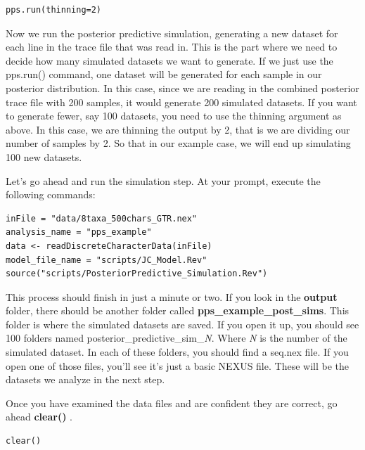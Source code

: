 {\tt \begin{snugshade*}
\begin{lstlisting}
pps.run(thinning=2)
\end{lstlisting}
\end{snugshade*}}
Now we run the posterior predictive simulation, generating a new dataset for each line in the trace file 
that was read in. This is the part where we need to decide how many simulated datasets we want to generate.
If we just use the pps.run() command, one dataset will be generated for each sample in our posterior distribution.
In this case, since we are reading in the combined posterior trace file with 200 
samples, it would generate 200 simulated datasets. If you want to generate fewer, say 100 datasets,
you need to use the thinning argument as above. In this case, we are thinning the output by 2, that is
we are dividing our number of samples by 2. So that in our example case, we will end up simulating 100 
new datasets.

Let's go ahead and run the simulation step. At your \RevBayes prompt, execute the following commands: 
{\tt \begin{Snugshade}[184,207,236]
\begin{lstlisting}
inFile = "data/8taxa_500chars_GTR.nex"
analysis_name = "pps_example"
data <- readDiscreteCharacterData(inFile)
model_file_name = "scripts/JC_Model.Rev"
source("scripts/PosteriorPredictive_Simulation.Rev")
\end{lstlisting}
\end{Snugshade}}

This process should finish in just a minute or two. If you look in the \textbf{output} folder, there should be 
another folder called \textbf{pps\_example\_post\_sims}. This folder is where the simulated datasets are saved. 
If you open it up, you should see 100 folders named posterior\_predictive\_sim\_\textit{N}. Where \textit{N} 
is the number of the simulated dataset. In each of these folders, you should find a seq.nex file. If you 
open one of those files, you'll see it's just a basic NEXUS file. These will be the datasets we analyze 
in the next step.

Once you have examined the data files and are confident they are correct, go ahead \textbf{clear()} \RevBayes.

{\tt \begin{Snugshade}[184,207,236]
\begin{lstlisting}
clear()
\end{lstlisting}
\end{Snugshade}}

